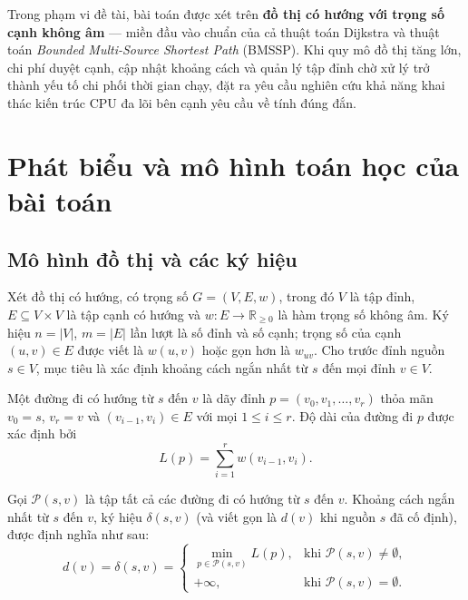 Trong phạm vi đề tài, bài toán được xét trên \textbf{đồ thị có hướng với trọng số cạnh không âm} --- miền đầu vào chuẩn của cả thuật toán Dijkstra và thuật toán \textit{Bounded Multi-Source Shortest Path} (BMSSP). Khi quy mô đồ thị tăng lớn, chi phí duyệt cạnh, cập nhật khoảng cách và quản lý tập đỉnh chờ xử lý trở thành yếu tố chi phối thời gian chạy, đặt ra yêu cầu nghiên cứu khả năng khai thác kiến trúc CPU đa lõi bên cạnh yêu cầu về tính đúng đắn.

\section{Phát biểu và mô hình toán học của bài toán}
\label{sec:phat-bieu-bai-toan}

\subsection{Mô hình đồ thị và các ký hiệu}

Xét đồ thị có hướng, có trọng số $G=(V,E,w)$, trong đó $V$ là tập đỉnh, $E\subseteq V\times V$ là tập cạnh có hướng và $w:E\rightarrow\mathbb{R}_{\ge 0}$ là hàm trọng số không âm. Ký hiệu $n=|V|$, $m=|E|$ lần lượt là số đỉnh và số cạnh; trọng số của cạnh $(u,v)\in E$ được viết là $w(u,v)$ hoặc gọn hơn là $w_{uv}$. Cho trước đỉnh nguồn $s\in V$, mục tiêu là xác định khoảng cách ngắn nhất từ $s$ đến mọi đỉnh $v\in V$.

Một đường đi có hướng từ $s$ đến $v$ là dãy đỉnh $p=(v_0,v_1,\ldots,v_r)$ thỏa mãn $v_0=s$, $v_r=v$ và $(v_{i-1},v_i)\in E$ với mọi $1\le i\le r$. Độ dài của đường đi $p$ được xác định bởi
\begin{equation}
    L(p)=\sum_{i=1}^{r} w(v_{i-1},v_i).
    \label{eq:duong-di-do-dai}
\end{equation}

Gọi $\mathcal{P}(s,v)$ là tập tất cả các đường đi có hướng từ $s$ đến $v$. Khoảng cách ngắn nhất từ $s$ đến $v$, ký hiệu $\delta(s,v)$ (và viết gọn là $d(v)$ khi nguồn $s$ đã cố định), được định nghĩa như sau:
\begin{equation}
    d(v) = \delta(s,v) =
    \begin{cases}
        \displaystyle\min_{p\in\mathcal{P}(s,v)} L(p),
        & \text{khi }\mathcal{P}(s,v)\neq\emptyset,\\[6pt]
        +\infty, & \text{khi }\mathcal{P}(s,v)=\emptyset.
    \end{cases}
    \label{eq:khoang-cach-ngan-nhat}
\end{equation}

